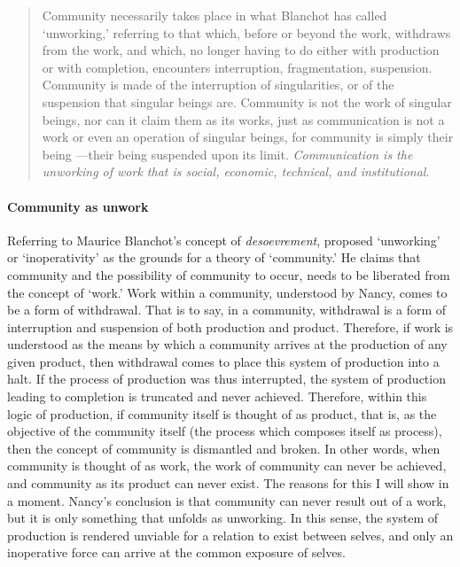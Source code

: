 \begin{quote}
	Community necessarily takes place in what Blanchot has called `unworking,' referring to that which, before or beyond the work, withdraws from the work, and which, no longer having to do either with production or with completion, encounters interruption, fragmentation, suspension. Community is made of the interruption of singularities, or of the suspension that singular beings are. Community is not the work of singular beings, nor can it claim them as its works, just as communication is not a work or even an operation of singular beings, for community is simply their being ---their being suspended upon its limit. \textit{Communication is the unworking of work that is social, economic, technical, and institutional}. \im \parencite[31]{Nan91:The} 
\end{quote} %

% 
% 
% 
% 
% 

\paragraph{Community as unwork}
Referring to Maurice Blanchot's concept of \textit{desoevrement}, \textcite{Nan91:The} proposed `unworking' or `inoperativity' as the grounds for a theory of `community.' He claims that community and the possibility of community to occur, needs to be liberated from the concept of `work.' Work within a community, understood by Nancy, comes to be a form of withdrawal. That is to say, in a community, withdrawal is a form of interruption and suspension of both production and product. Therefore, if work is understood as the means by which a community arrives at the production of any given product, then withdrawal comes to place this system of production into a halt. If the process of production was thus interrupted, the system of production leading to completion is truncated and never achieved. Therefore, within this logic of production, if community itself is thought of as product, that is, as the objective of the community itself (the process which composes itself as process), then the concept of community is dismantled and broken. In other words, when community is thought of as work, the work of community can never be achieved, and community as its product can never exist. The reasons for this I will show in a moment. Nancy's conclusion is that community can never result out of a work, but it is only something that unfolds as unworking. In this sense, the system of production is rendered unviable for a relation to exist between selves, and only an inoperative force can arrive at the common exposure of selves.

